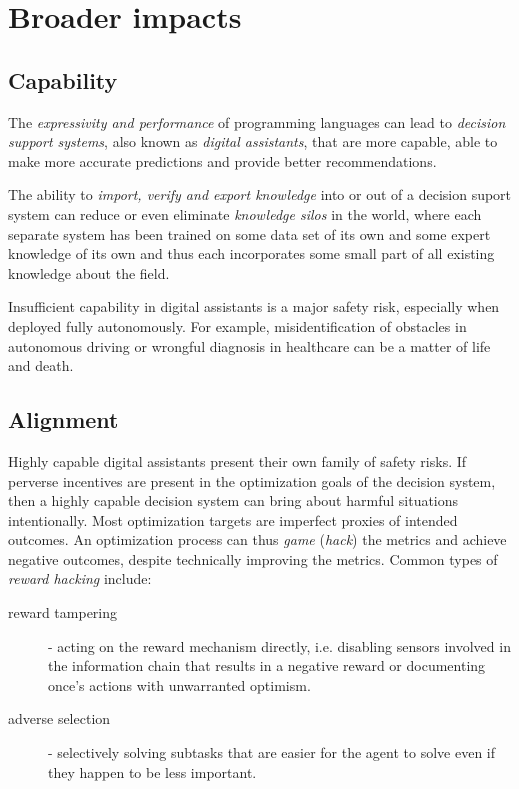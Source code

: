 \newpage
\section{Broader impacts}
\label{sec:impacts}

\subsection{Capability}

The \emph{expressivity and performance} of programming languages can lead to \emph{decision support systems}, also known as \emph{digital assistants}, that are more capable, able to make more accurate predictions and provide better recommendations.

The ability to \emph{import, verify and export knowledge} into or out of a decision suport system can reduce or even eliminate \emph{knowledge silos} in the world, where each separate system has been trained on some data set of its own and some expert knowledge of its own and thus each incorporates some small part of all existing knowledge about the field. 

Insufficient capability in digital assistants is a major safety risk, especially when deployed fully autonomously. For example, misidentification of obstacles in autonomous driving \cite{sheebajoiceObstacleDetectionSafe2023} or wrongful diagnosis in healthcare \cite{wintersDiagnosticErrorsIntensive2012} can be a matter of life and death.

\subsection{Alignment}
\label{sec:alignment}

Highly capable digital assistants present their own family of safety risks. 
If perverse incentives are present in the optimization goals of the decision system, then a highly capable decision system can bring about harmful situations intentionally.
Most optimization targets are imperfect proxies of intended outcomes. 
An optimization process can thus \emph{game} (\emph{hack}) the metrics and achieve negative outcomes, despite technically improving the metrics.
Common types of \emph{reward hacking} \cite{skalseDefiningCharacterizingReward2022} include:
\begin{description}
    \item[reward tampering] \cite{everittRewardTamperingProblems2021,skalseInvariancePolicyOptimisation2023} - acting on the reward mechanism directly, i.e. disabling sensors involved in the information chain that results in a negative reward or documenting once's actions with unwarranted optimism.
    \item[adverse selection] - selectively solving subtasks that are easier for the agent to solve even if they happen to be less important.
\end{description}

